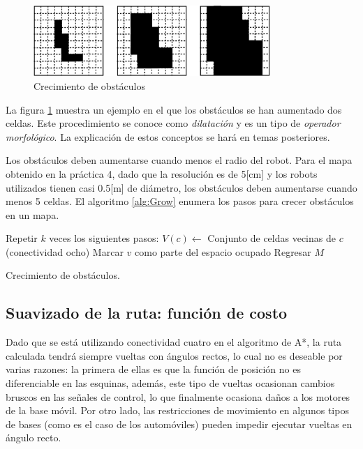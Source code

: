 \documentclass[letterpaper,12pt]{article}
\begin{document}
\begin{figure}
\centering
\includegraphics[width=0.8\textwidth]{Figures/Grow.eps}
\caption{Crecimiento de obstáculos}
\label{fig:Grow}
\end{figure}

La figura \ref{fig:Grow} muestra un ejemplo en el que los obstáculos se han aumentado dos celdas. Este procedimiento se conoce como \textit{dilatación} y es un tipo de \textit{operador morfológico}. La explicación de estos conceptos se hará en temas posteriores.

Los obstáculos deben aumentarse cuando menos el radio del robot. Para el mapa obtenido en la práctica 4, dado que la resolución es de 5[cm] y los robots utilizados tienen casi 0.5[m] de diámetro, los obstáculos deben aumentarse cuando menos 5 celdas. El algoritmo \ref{alg:Grow} enumera los pasos para crecer obstáculos en un mapa.

\begin{algorithm}
\DontPrintSemicolon
{}
Repetir $k$ veces los siguientes pasos:\;
{
  {
    $V(c) \leftarrow $ Conjunto de celdas vecinas de $c$ (conectividad ocho)\;
    {
      Marcar $v$ como parte del espacio ocupado\;
    }
  }
}
Regresar $M$
\caption{Crecimiento de obstáculos.}
\label{alg:Grow}
\end{algorithm}


\subsection{Suavizado de la ruta: función de costo}
Dado que se está utilizando conectividad cuatro en el algoritmo de A*, la ruta calculada tendrá siempre vueltas con ángulos rectos, lo cual no es deseable por varias razones: la primera de ellas es que la función de posición no es diferenciable en las esquinas, además, este tipo de vueltas ocasionan cambios bruscos en las señales de control, lo que finalmente ocasiona daños a los motores de la base móvil. Por otro lado, las restricciones de movimiento en algunos tipos de bases (como es el caso de los automóviles) pueden impedir ejecutar vueltas en ángulo recto.
\end{document}
